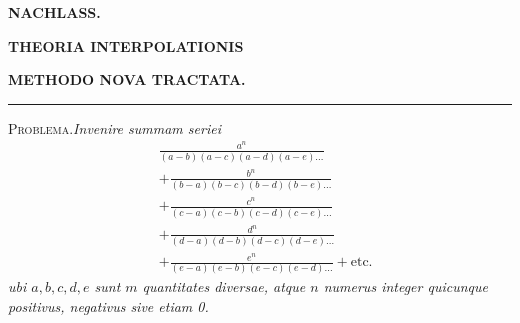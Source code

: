 \clearpage
{}
\begingroup
\renewcommand{\arraystretch}{1.35}
\begin{center}\textbf{NACHLASS.}\par\bigskip
\textbf{THEORIA INTERPOLATIONIS}\par\medskip
\textbf{METHODO NOVA TRACTATA.}\par\medskip
\rule{.15\linewidth}{.4pt}\end{center}
\textsc{Problema.}\quad\textit{Invenire summam seriei}
\[
\begin{aligned}
&\frac{a^n}{(a-b)(a-c)(a-d)(a-e)\ldots}\\[5pt]
&+\frac{b^n}{(b-a)(b-c)(b-d)(b-e)\ldots}\\
&+\frac{c^n}{(c-a)(c-b)(c-d)(c-e)\ldots}\\[5pt]
&+\frac{d^n}{(d-a)(d-b)(d-c)(d-e)\ldots}\\
&+\frac{e^n}{(e-a)(e-b)(e-c)(e-d)\ldots}+\text{etc.}
\end{aligned}
\]
\textit{ubi $a,b,c,d,e$ sunt $m$ quantitates diversae, atque $n$ numerus integer quicunque positivus, negativus sive etiam 0.}

